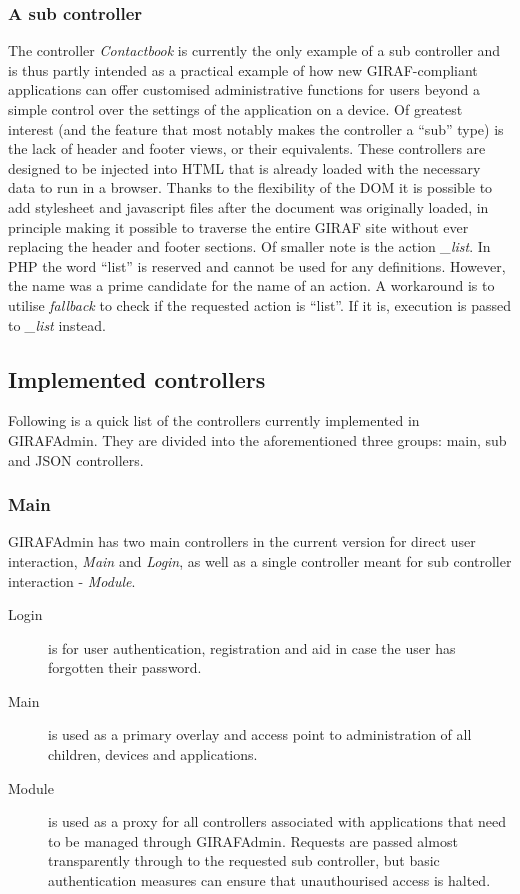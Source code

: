 \subsubsection*{A sub controller}
\label{controller_sub}


The controller \emph{Contactbook} is currently the only example of a sub controller and is thus partly intended as a practical example of how new GIRAF-compliant applications can offer customised administrative functions for users beyond a simple control over the settings of the application on a device.
Of greatest interest (and the feature that most notably makes the controller a ``sub'' type) is the lack of header and footer views, or their equivalents. These controllers are designed to be injected into HTML that is already loaded with the necessary data to run in a browser. Thanks to the flexibility of the DOM it is possible to add stylesheet and javascript files after the document was originally loaded, in principle making it possible to traverse the entire GIRAF site without ever replacing the header and footer sections.
Of smaller note is the action  \emph{\_list}. In PHP the word ``list'' is reserved and cannot be used for any definitions. However, the name was a prime candidate for the name of an action. A workaround is to utilise \emph{fallback} to check if the requested action is ``list''. If it is, execution is passed to \emph{\_list} instead.
\newline
\subsection{Implemented controllers}
Following is a quick list of the controllers currently implemented in GIRAFAdmin. They are divided into the aforementioned three groups: main, sub and JSON controllers.

\subsubsection*{Main}
GIRAFAdmin has two main controllers in the current version for direct user interaction, \emph{Main} and \emph{Login}, as well as a single controller meant for sub controller interaction - \emph{Module}.
\begin{description}
    \item[Login] is for user authentication, registration and aid in case the user has forgotten their password.
    \item[Main] is used as a primary overlay and access point to administration of all children, devices and applications.
    \item[Module] is used as a proxy for all controllers associated with applications that need to be managed through GIRAFAdmin. Requests are passed almost transparently through to the requested sub controller, but basic authentication measures can ensure that unauthourised access is halted.
\end{description}

